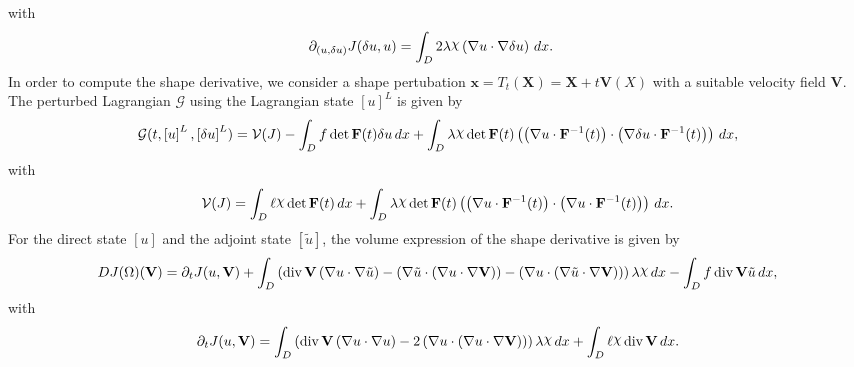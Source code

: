 \documentclass[preview]{standalone}
\let\oldcdot\cdot
\let\cdot\oldcdot
\begin{document}
with 
\begin{align*}
\partial_{(u,\delta u)} J(\delta u,u) &=  \int_{D} 2 \lambda \raisebox{\depth}{$\chi$} \left(  \nabla u  \cdot  \nabla \delta u  \right) \,dx.
 \end{align*}
In order to compute the shape derivative, we consider a shape pertubation $\mathbf x = T_t(\mathbf X) = \mathbf X + t \mathbf  V(X)$ with a suitable velocity field $\mathbf V$. The perturbed Lagrangian $\mathcal G$ using the Lagrangian state $\left[ u\right]^{L}$ is given by
\begin{dmath*}
\mathcal G(t,\left[ u\right]^{L},\left[ \delta u\right]^{L}) = \mathcal V(J) -  \int_{D} f  \operatorname{det}\mathbf F( t )  \delta u \,dx +  \int_{D} \lambda \raisebox{\depth}{$\chi$}  \operatorname{det}\mathbf F( t )  \left( \left(  \nabla u  \cdot  \mathbf F^{-1}(t) \right) \cdot \left(  \nabla \delta u  \cdot  \mathbf F^{-1}(t) \right) \right) \,dx , 
\end{dmath*}
with
\begin{dmath*}
\mathcal V(J) =  \int_{D} \ell \raisebox{\depth}{$\chi$}  \operatorname{det}\mathbf F( t )  \,dx +  \int_{D} \lambda \raisebox{\depth}{$\chi$}  \operatorname{det}\mathbf F( t )  \left( \left(  \nabla u  \cdot  \mathbf F^{-1}(t) \right) \cdot \left(  \nabla u  \cdot  \mathbf F^{-1}(t) \right) \right) \,dx.
 \end{dmath*}
For the direct state $\left[ u\right]$ and the adjoint state $\left[ \tilde u\right]$, the volume expression of the shape derivative is given by
\begin{dmath*}
DJ(\Omega)(\mathbf V) = \partial_{t} J(u,{\mathbf V}) +  \int_{D} \left(\operatorname{div} {\mathbf V} \left(  \nabla u  \cdot  \nabla \tilde u  \right) - \left(  \nabla \tilde u  \cdot \left(  \nabla u  \cdot  \nabla {\mathbf V}  \right) \right) - \left(  \nabla u  \cdot \left(  \nabla \tilde u  \cdot  \nabla {\mathbf V}  \right) \right)\right) \lambda \raisebox{\depth}{$\chi$} \,dx -  \int_{D} f \operatorname{div} {\mathbf V} \tilde u \,dx , 
\end{dmath*}
with
\begin{dmath*}
\partial_{t} J(u,{\mathbf V}) =  \int_{D} \left(\operatorname{div} {\mathbf V} \left(  \nabla u  \cdot  \nabla u  \right) - 2 \left(  \nabla u  \cdot \left(  \nabla u  \cdot  \nabla {\mathbf V}  \right) \right)\right) \lambda \raisebox{\depth}{$\chi$} \,dx +  \int_{D} \ell \raisebox{\depth}{$\chi$} \operatorname{div} {\mathbf V} \,dx.
 \end{dmath*}
\end{document}

